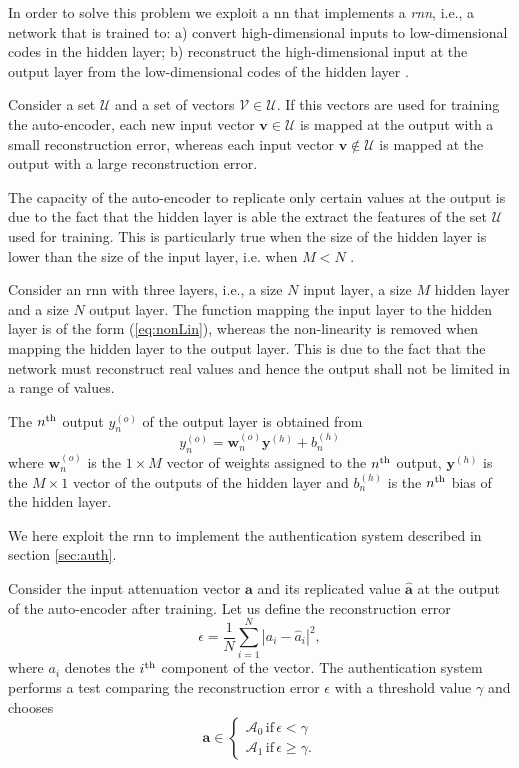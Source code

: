 \documentclass[draftcls,onecolumn,12pt]{IEEEtran}
\begin{document}
In order to solve this problem we exploit a \ac{nn} that implements a \textit{\ac{rnn}}, i.e., a network that is trained to: a) convert high-dimensional inputs to low-dimensional codes in the hidden layer; b) reconstruct the high-dimensional input at the output layer from the low-dimensional codes of the hidden layer \cite{Hinton-2006}.

Consider a set $\mathcal{U}$ and a set of vectors $\mathcal{V} \in \mathcal{U}$. If this vectors are used for training the auto-encoder, each new input vector $\bm{v} \in \mathcal{U}$ is mapped at the output with a small reconstruction error, whereas each input vector $\bm{v} \notin \mathcal{U} $ is mapped at the output with a large reconstruction error.

The capacity of the auto-encoder to replicate only certain values at the output is due to the fact that the hidden layer is able the extract the features of the set $\mathcal{U}$ used for training. This is particularly true when the size of the hidden layer is lower than the size of the input layer, i.e. when $M<N$ \cite{Bourlard-88}.

Consider an \ac{rnn} with three layers, i.e., a size $N$ input layer, a size $M$ hidden layer and a size $N$ output layer.  The function mapping the input layer to the hidden layer is of the form (\ref{eq:nonLin}), whereas the non-linearity is removed when mapping the hidden layer to the output layer. This is due to the fact that the network must reconstruct real values and hence the output shall not be limited in a range of values. 

The $n^{\rm th}$ output $y_n^{(o)}$ of the output layer is obtained from
\begin{equation}
    y_n^{(o)}= \bm{w}_n^{(o)}\bm{y}^{(h)}+b_n^{(h)}
\end{equation}
where $\bm{w}_n^{(o)}$ is the $1\times M$ vector of weights assigned to the $n^{\rm th}$ output, $\bm{y}^{(h)}$ is the $M\times 1$ vector of the outputs of the hidden layer and $b_n^{(h)}$ is the $n^{\rm th}$ bias of the hidden layer.


We here exploit the \ac{rnn} to implement the authentication system described in section \ref{sec:auth}. 

Consider the input attenuation vector $\bm{a}$ and its replicated value $\hat{\bm{a}}$ at the output of the auto-encoder after training.
Let us define the reconstruction error
\begin{equation}\label{eq: rec err}
    \epsilon = \frac{1}{N}\sum_{i=1}^{N}|a_i-\hat{a}_i|^2,
\end{equation}
where $a_i$ denotes the $i^{\rm th}$ component of the vector. The authentication system performs a test comparing the reconstruction error $\epsilon$ with a threshold value $\gamma$ and chooses 
\begin{equation}
\bm{a} \in
\begin{cases}
\mathcal{A}_0 \, \text{if} \, \epsilon < \gamma \\
\mathcal{A}_1 \, \text{if} \, \epsilon \ge \gamma. 
\end{cases}
\end{equation}
\end{document}
